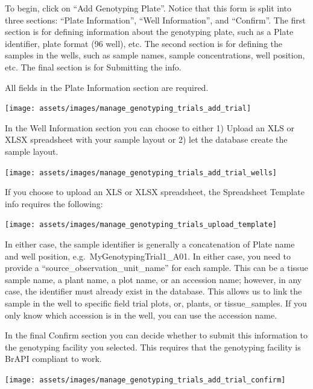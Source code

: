 \documentclass[
  12pt,
]{book}
\begin{document}
To begin, click on ``Add Genotyping Plate''. Notice that this form is split into three sections: ``Plate Information'', ``Well Information'', and ``Confirm''. The first section is for defining information about the genotyping plate, such as a Plate identifier, plate format (96 well), etc. The second section is for defining the samples in the wells, such as sample names, sample concentrations, well position, etc. The final section is for Submitting the info.

All fields in the Plate Information section are required.

\begin{center}\texttt{[image: assets/images/manage\_genotyping\_trials\_add\_trial]} \end{center}

In the Well Information section you can choose to either 1) Upload an XLS or XLSX spreadsheet with your sample layout or 2) let the database create the sample layout.

\begin{center}\texttt{[image: assets/images/manage\_genotyping\_trials\_add\_trial\_wells]} \end{center}

If you choose to upload an XLS or XLSX spreadsheet, the Spreadsheet Template info requires the following:

\begin{center}\texttt{[image: assets/images/manage\_genotyping\_trials\_upload\_template]} \end{center}

In either case, the sample identifier is generally a concatenation of Plate name and well position, e.g.~MyGenotypingTrial1\_A01. In either case, you need to provide a ``source\_observation\_unit\_name'' for each sample. This can be a tissue sample name, a plant name, a plot name, or an accession name; however, in any case, the identifier must already exist in the database. This allows us to link the sample in the well to specific field trial plots, or, plants, or tissue\_samples. If you only know which accession is in the well, you can use the accession name.

In the final Confirm section you can decide whether to submit this information to the genotyping facility you selected. This requires that the genotyping facility is BrAPI compliant to work.

\begin{center}\texttt{[image: assets/images/manage\_genotyping\_trials\_add\_trial\_confirm]} \end{center}
\end{document}
